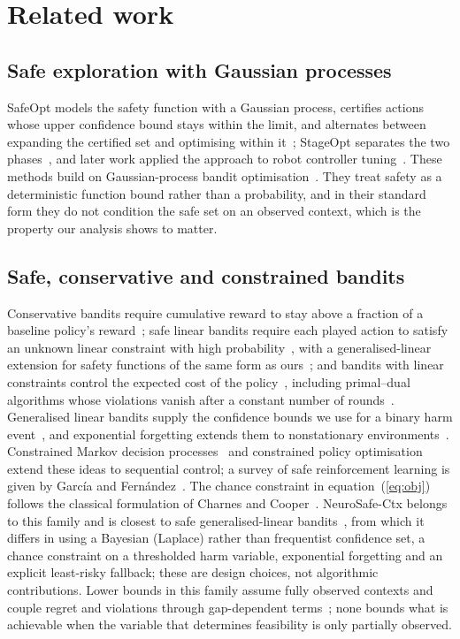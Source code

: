 \documentclass[10pt,a4paper]{article}
\begin{document}
\section*{Related work}

\subsection*{Safe exploration with Gaussian processes}
SafeOpt models the safety function with a Gaussian process, certifies actions whose upper confidence
bound stays within the limit, and alternates between expanding the certified set and optimising
within it~\cite{sui2015safeopt}; StageOpt separates the two phases~\cite{sui2018stageopt}, and later
work applied the approach to robot controller tuning~\cite{berkenkamp2023}. These methods build on
Gaussian-process bandit optimisation~\cite{srinivas2010,rasmussen2006}. They treat safety as a
deterministic function bound rather than a probability, and in their standard form they do not
condition the safe set on an observed context, which is the property our analysis shows to matter.


\subsection*{Safe, conservative and constrained bandits}
Conservative bandits require cumulative reward to stay above a fraction of a baseline policy's
reward~\cite{wu2016conservative,kazerouni2017conservative}; safe linear bandits require each played
action to satisfy an unknown linear constraint with high
probability~\cite{amani2019linear,moradipari2021}, with a generalised-linear extension for safety functions of the same form as ours~\cite{amani2020glm}; and bandits with linear constraints control the expected cost of the policy~\cite{pacchiano2021}, including primal--dual algorithms whose violations vanish after a constant number of rounds~\cite{liu2021}. Generalised linear bandits supply the confidence bounds we use for a binary harm event~\cite{filippi2010,li2017glm}, and exponential forgetting extends them to nonstationary environments~\cite{russac2021}. Constrained Markov decision
processes~\cite{altman1999cmdp} and constrained policy optimisation~\cite{achiam2017cpo} extend these
ideas to sequential control; a survey of safe reinforcement learning is given by García and
Fernández~\cite{garcia2015survey}. The chance constraint in equation~(\ref{eq:obj}) follows the
classical formulation of Charnes and Cooper~\cite{charnes1959}. NeuroSafe-Ctx belongs to this family and is closest to safe generalised-linear bandits~\cite{amani2020glm}, from which it differs in using a Bayesian (Laplace) rather than frequentist confidence set, a chance constraint on a thresholded harm variable, exponential forgetting and an explicit least-risky fallback; these are design choices, not algorithmic contributions. Lower bounds in this family assume fully observed contexts and couple regret and violations through gap-dependent terms~\cite{chen2022}; none bounds what is achievable when the variable that determines feasibility is only partially observed.
\end{document}
